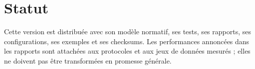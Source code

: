\documentclass[11pt,a4paper]{report}
\begin{document}
\chapter{Statut}
Cette version est distribuée avec son modèle normatif, ses tests, ses rapports, ses configurations, ses exemples et ses checksums. Les performances annoncées dans les rapports sont attachées aux protocoles et aux jeux de données mesurés ; elles ne doivent pas être transformées en promesse générale.
\end{document}
